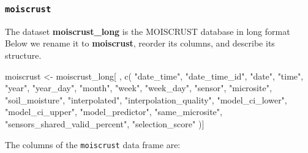 \documentclass[
  table]{article}
\newenvironment{Shaded}{\begin{snugshade}}{\end{snugshade}}
\newcommand{\FunctionTok}[1]{\textcolor[rgb]{0.00,0.00,0.00}{#1}}
\newcommand{\NormalTok}[1]{#1}
\newcommand{\OtherTok}[1]{\textcolor[rgb]{0.56,0.35,0.01}{#1}}
\newcommand{\StringTok}[1]{\textcolor[rgb]{0.31,0.60,0.02}{#1}}
\begin{document}
\hypertarget{moiscrust}{%
\subsubsection{\texorpdfstring{\texttt{moiscrust}}{moiscrust}}\label{moiscrust}}

The dataset \textbf{moiscrust\_long} is the MOISCRUST database in long
format Below we rename it to \textbf{moiscrust}, reorder its columns,
and describe its structure.

\begin{Shaded}
\begin{Highlighting}[]
\NormalTok{moiscrust }\OtherTok{\textless{}{-}}\NormalTok{ moiscrust\_long[ , }\FunctionTok{c}\NormalTok{(}
  \StringTok{"date\_time"}\NormalTok{,}
  \StringTok{"date\_time\_id"}\NormalTok{,}
  \StringTok{"date"}\NormalTok{,}
  \StringTok{"time"}\NormalTok{,}
  \StringTok{"year"}\NormalTok{,}
  \StringTok{"year\_day"}\NormalTok{,}
  \StringTok{"month"}\NormalTok{,}
  \StringTok{"week"}\NormalTok{,}
  \StringTok{"week\_day"}\NormalTok{,}
  \StringTok{"sensor"}\NormalTok{,}
  \StringTok{"microsite"}\NormalTok{,}
  \StringTok{"soil\_moisture"}\NormalTok{,}
  \StringTok{"interpolated"}\NormalTok{,}
  \StringTok{"interpolation\_quality"}\NormalTok{,}
  \StringTok{"model\_ci\_lower"}\NormalTok{,}
  \StringTok{"model\_ci\_upper"}\NormalTok{,}
  \StringTok{"model\_predictor"}\NormalTok{,}
  \StringTok{"same\_microsite"}\NormalTok{,}
  \StringTok{"sensors\_shared\_valid\_percent"}\NormalTok{,}
  \StringTok{"selection\_score"}
\NormalTok{)]}
\end{Highlighting}
\end{Shaded}

The columns of the \texttt{moiscrust} data frame are:
\end{document}

